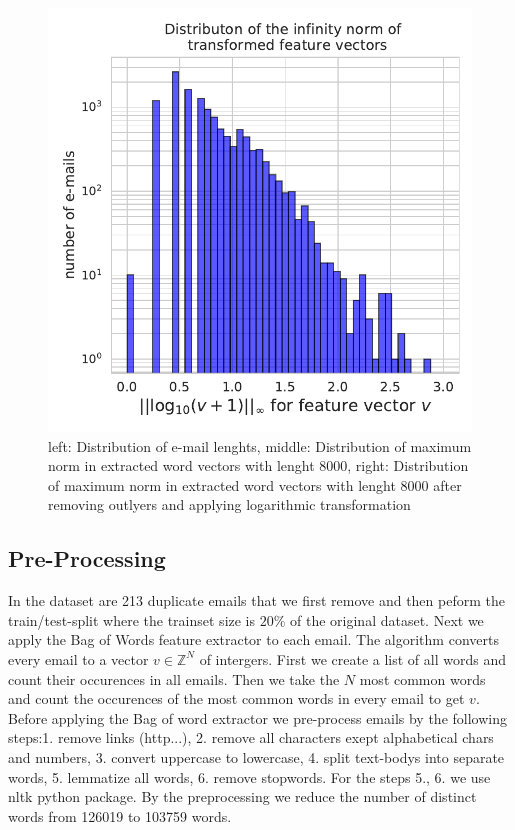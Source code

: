 \documentclass[11pt]{article}
\begin{document}
\begin{figure}
\begin{minipage}[t]{0.3\textwidth}
\end{minipage}
\begin{minipage}[t]{0.3\textwidth}
\includegraphics[width=1\linewidth]{email_spam/word_transformed_count.pdf}
\end{minipage}
   \caption{left: Distribution of e-mail lenghts, middle: Distribution of maximum norm in extracted word vectors with lenght 8000, right: Distribution of maximum norm in extracted word vectors with lenght 8000 after removing outlyers and applying logarithmic transformation}
\label{spamfig_fig0}
\end{figure}

\subsection{Pre-Processing}
In the dataset are 213 duplicate emails that we first remove and then peform the train/test-split where the trainset size is $20\%$ of the original dataset. Next we apply the Bag of Words feature extractor to each email. The algorithm converts every email to a vector $v\in\mathbb{Z}^N$ of intergers. First we create a list of all words and count their occurences in all emails. Then we take the $N$ most common words and count the occurences of the most common words in every email to get $v$. Before applying the Bag of word extractor we pre-process emails by the following steps:1. remove links (http...), 2. remove all characters exept alphabetical chars and numbers, 3. convert uppercase to lowercase, 4. split text-bodys into separate words, 5. lemmatize all words, 6. remove stopwords. For the steps 5., 6. we use nltk python package. By the preprocessing we reduce the number of distinct words from 126019 to 103759 words. 
\end{document}
